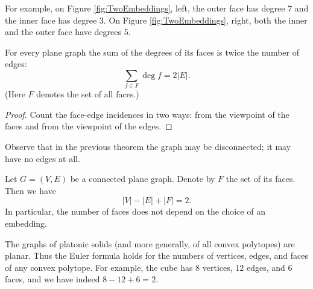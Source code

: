 \begin{page}
\setcounter{section}{3}
\setcounter{subsection}{2}
\setcounter{dfn}{5}
\label{portion:291}

For example, on Figure \ref{fig:TwoEmbeddings}, left, the outer face has degree 7 and the inner face has degree 3.
On Figure \ref{fig:TwoEmbeddings}, right, both the inner and the outer face have degrees 5.


\end{page}

\begin{page}
\setcounter{section}{3}
\setcounter{subsection}{2}
\setcounter{dfn}{6}
\label{portion:293}

\begin{thm}
\label{thm:DualHandshake}
For every plane graph the sum of the degrees of its faces is twice the number of edges:
\[
\sum_{f \in F} \deg f = 2 |E|.
\]
(Here $F$ denotes the set of all faces.)
\end{thm}

\end{page}

\begin{page}
\setcounter{section}{3}
\setcounter{subsection}{2}
\setcounter{dfn}{6}
\label{portion:294}

\begin{proof}
Count the face-edge incidences in two ways:
from the viewpoint of the faces and from the viewpoint of the edges.
\end{proof}
Observe that in the previous theorem the graph may be disconnected; it may have no edges at all.


\end{page}

\begin{page}
\setcounter{section}{3}
\setcounter{subsection}{2}
\setcounter{dfn}{7}
\label{portion:296}

\begin{thm}[Euler]
Let $G = (V, E)$ be a connected plane graph.
Denote by $F$ the set of its faces.
Then we have
\[
|V| - |E| + |F| = 2.
\]
In particular, the number of faces does not depend on the choice of an embedding.
\end{thm}

\end{page}

\begin{page}
\setcounter{section}{3}
\setcounter{subsection}{2}
\setcounter{dfn}{8}
\label{portion:299}

\begin{exl}
The graphs of platonic solids (and more generally, of all convex polytopes) are planar.
Thus the Euler formula holds for the numbers of vertices, edges, and faces of any convex polytope.
For example, the cube has $8$ vertices, $12$ edges, and $6$ faces, and we have indeed $8-12+6=2$.
\end{exl}

\end{page}


